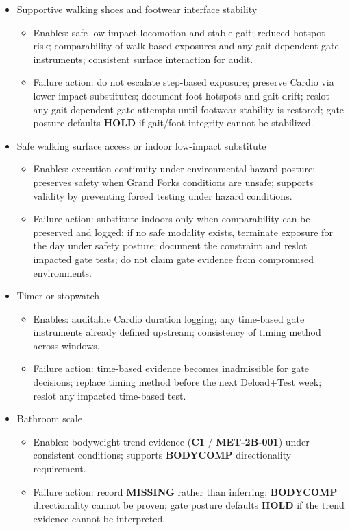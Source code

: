 \documentclass[10pt]{article}
\begin{document}
\begin{itemize}
\item Supportive walking shoes and footwear interface stability
  \begin{itemize}
  \item Enables: safe low-impact locomotion and stable gait; reduced hotspot risk; comparability of walk-based exposures and any gait-dependent gate instruments; consistent surface interaction for audit.
  \item Failure action: do not escalate step-based exposure; preserve Cardio via lower-impact substitutes; document foot hotspots and gait drift; reslot any gait-dependent gate attempts until footwear stability is restored; gate posture defaults \textbf{HOLD} if gait/foot integrity cannot be stabilized.
  \end{itemize}

\item Safe walking surface access or indoor low-impact substitute
  \begin{itemize}
  \item Enables: execution continuity under environmental hazard posture; preserves safety when Grand Forks conditions are unsafe; supports validity by preventing forced testing under hazard conditions.
  \item Failure action: substitute indoors only when comparability can be preserved and logged; if no safe modality exists, terminate exposure for the day under safety posture; document the constraint and reslot impacted gate tests; do not claim gate evidence from compromised environments.
  \end{itemize}

\item Timer or stopwatch
  \begin{itemize}
  \item Enables: auditable Cardio duration logging; any time-based gate instruments already defined upstream; consistency of timing method across windows.
  \item Failure action: time-based evidence becomes inadmissible for gate decisions; replace timing method before the next Deload+Test week; reslot any impacted time-based test.
  \end{itemize}

\item Bathroom scale
  \begin{itemize}
  \item Enables: bodyweight trend evidence (\textbf{C1} / \textbf{MET-2B-001}) under consistent conditions; supports \textbf{BODYCOMP} directionality requirement.
  \item Failure action: record \textbf{MISSING} rather than inferring; \textbf{BODYCOMP} directionality cannot be proven; gate posture defaults \textbf{HOLD} if the trend evidence cannot be interpreted.
  \end{itemize}


\end{itemize}
\end{document}
